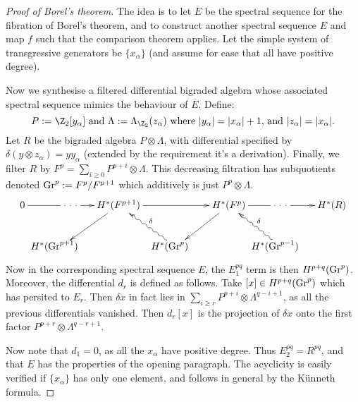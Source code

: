 \documentclass[11pt]{article}
\begin{document}
\begin{proof}[Proof of Borel's theorem]
\newcommand{\shrt}[1]{\makebox[0cm]{\ensuremath{#1}}}
The idea is to let $\overline E$ be the spectral sequence for the fibration of Borel's theorem, and to construct another spectral sequence $E$ and map $f$ such that the comparison theorem applies. Let the simple system of transgressive generators be $\{x_\alpha\}$ (and assume for ease that all have positive degree).

Now we synthesise a filtered differential bigraded algebra whose associated spectral sequence mimics the behaviour of $\overline E$. Define:
\[P:=\Z_2[y_\alpha]\text{ and }\Lambda:=\Lambda_{\Z_2}(z_\alpha)\text{ where $|y_\alpha|=|x_\alpha|+1$, and $|z_\alpha|=|x_\alpha|.$}\]
Let $R$ be the bigraded algebra $P\otimes\Lambda$, with differential specified by $\delta(y\otimes z_\alpha)=yy_\alpha$ (extended by the requirement it's a derivation). Finally, we filter $R$ by $F^p=\sum_{i\geq 0}P^{p+i}\otimes\Lambda$. This decreasing filtration has subquotients denoted $\textup{Gr}^p:=F^p/F^{p+1}$ which additively is just $P^p\otimes\Lambda$.
\[\xymatrix{
0\ar[rr]|{\ \cdot\ \cdot\ \cdot\ }&&H^*(F^{p+1})\ar[rr] \ar[ld]&&H^*(F^{p})\ar[ld]
\ar[rr]|{\ \cdot\ \cdot\ \cdot\ }&&H^*(R)\\
&
\shrt{H^*(\Gr^{p+1})}\phantom{\binom{5}{3}}&&
\shrt{H^*(\Gr^{p})}\phantom{\binom{5}{3}}\ar@{~>}[lu]_\delta&&
\shrt{H^*(\Gr^{p-1})}\phantom{\binom{5}{3}}\ar@{~>}[lu]_\delta
}\]
Now in the corresponding spectral sequence $E$, the $E_1^{pq}$ term is then $H^{p+q}(\textup{Gr}^p)$. Moreover, the differential $d_r$ is defined as follows. Take $[x]\in H^{p+q}(\textup{Gr}^p)$ which has persited to $E_r$. Then $\delta x$  in fact lies in $\sum_{i\geq r}P^{p+i}\otimes \Lambda^{q-i+1}$, as all the previous differentials vanished. Then $d_r[x]$ is the projection of $\delta x$ onto the first factor $P^{p+r}\otimes \Lambda^{q-r+1}$.

Now note that $d_1=0$, as all the $x_\alpha$ have positive degree. Thus $E_2^{pq}=R^{pq}$, and that $E$ has the properties of the opening paragraph. The acyclicity is easily verified if $\{x_\alpha\}$ has only one element, and follows in general by the K\"unneth formula.


\end{proof}
\end{document}
